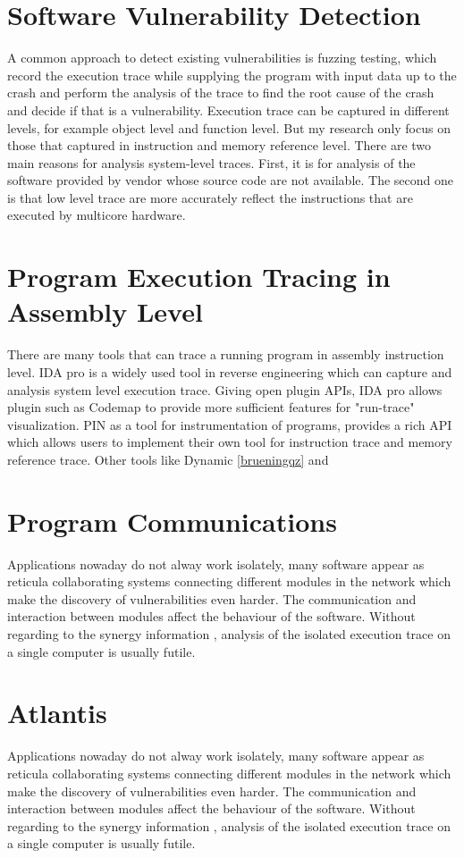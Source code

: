 \section{Software Vulnerability Detection}
A common approach to detect existing vulnerabilities is fuzzing testing, which record the execution trace while supplying the program with input data up to the crash and perform the analysis of the trace to find the root cause of the crash and decide if that is a vulnerability\cite{cleary_reconstructing_2013}. Execution trace can be captured in different levels, for example object level and function level. But my research only focus on those that captured in instruction and memory reference level. There are two main reasons for analysis system-level traces. First, it is for analysis of the software provided by vendor whose source code are not available. The second one is that low level trace are more accurately reflect the instructions that are executed by multicore hardware\cite{wang_predicting_2011}. 


\section{Program Execution Tracing in Assembly Level }
There are many tools that can trace a running program in assembly instruction level.  IDA pro \cite{eagle_ida_2008} is a widely used tool in reverse engineering which can capture and analysis system level execution trace. Giving open plugin APIs, IDA pro allows plugin such as Codemap \cite{_c0demap/codemap:_????} to provide more sufficient features for "run-trace" visualization. PIN\cite{_pin_????} as a tool for instrumentation of programs, provides a rich API which allows users to implement their own tool for instruction trace and memory reference trace. Other tools like Dynamic \ref{brueningqz} and 

\section{Program Communications}
Applications nowaday do not alway work isolately,  many software  appear as  reticula collaborating systems connecting different modules in the network\cite{PhysRevE.68.046116} which make the discovery of vulnerabilities even harder. The communication and interaction between modules affect the behaviour of the software. Without regarding to the synergy information , analysis of the isolated execution trace on a single computer is usually futile. 

\section{Atlantis}
Applications nowaday do not alway work isolately,  many software  appear as  reticula collaborating systems connecting different modules in the network\cite{PhysRevE.68.046116} which make the discovery of vulnerabilities even harder. The communication and interaction between modules affect the behaviour of the software. Without regarding to the synergy information , analysis of the isolated execution trace on a single computer is usually futile. 


